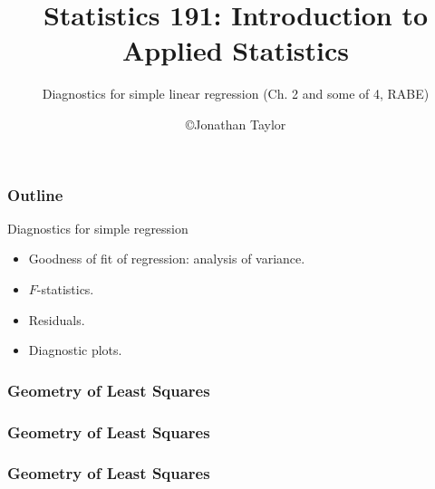 \documentclass[handout]{beamer}
\title{Statistics 191: Introduction to Applied Statistics}
\subtitle{Diagnostics for simple linear regression  (Ch. 2 and some of 4, RABE)}
\author{\copyright Jonathan Taylor \\
   }
\begin{document}
   \begin{frame}
   \titlepage
   \end{frame}


   \begin{frame} \frametitle{Outline}

   \begin{block}{Diagnostics for simple regression}
   \begin{itemize}
   \item Goodness of fit of regression: analysis of variance.

   \item $F$-statistics.

   \item Residuals.

   \item Diagnostic plots.
   \end{itemize}
   \end{block}
   \end{frame}


   \begin{frame} \frametitle{Geometry of Least Squares}

   \end{frame}


   \begin{frame} \frametitle{Geometry of Least Squares}

   \end{frame}


   \begin{frame} \frametitle{Geometry of Least Squares}

   \end{frame}

\end{document}
